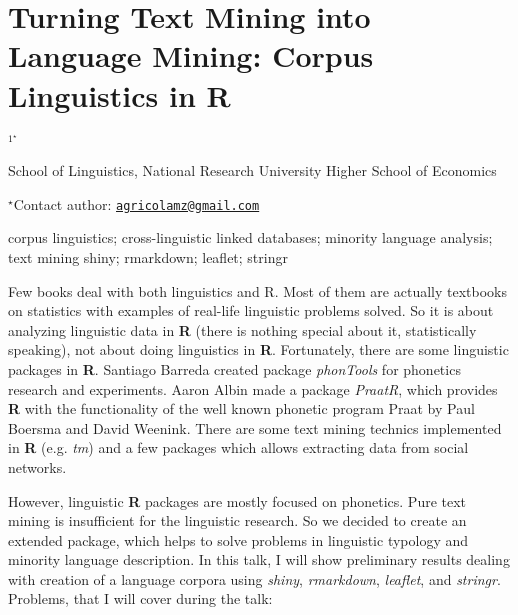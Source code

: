 \documentclass[\main/boa.tex]{subfiles}
\begin{document}
\section{Turning Text Mining into Language Mining: Corpus Linguistics in R}

\begin{center}
  {\bf {}$^{1^\star}$}
\end{center}

\vskip 0.3cm

\begin{affiliations}
\begin{enumerate}
\begin{minipage}{0.915\textwidth}
\centering
\item School of Linguistics, National Research University Higher School of
Economics \\[-2pt]
\end{minipage}
\end{enumerate}
$^\star$Contact author: \href{mailto:agricolamz@gmail.com}{\nolinkurl{agricolamz@gmail.com}}\\
\end{affiliations}

\vskip 0.5cm

\begin{minipage}{0.915\textwidth}
\keywords corpus linguistics; cross-linguistic linked databases; minority language
analysis; text mining
\packages shiny; rmarkdown; leaflet; stringr
\end{minipage}

\vskip 0.8cm

Few books deal with both linguistics and R. Most of them are actually
textbooks on statistics with examples of real-life linguistic problems
solved. So it is about analyzing linguistic data in \textbf{R} (there is
nothing special about it, statistically speaking), not about doing
linguistics in \textbf{R}. Fortunately, there are some linguistic
packages in \textbf{R}. Santiago Barreda created package
\emph{phonTools} for phonetics research and experiments. Aaron Albin
made a package \emph{PraatR}, which provides \textbf{R} with the
functionality of the well known phonetic program Praat by Paul Boersma
and David Weenink. There are some text mining technics implemented in
\textbf{R} (e.g. \emph{tm}) and a few packages which allows extracting
data from social networks.

However, linguistic \textbf{R} packages are mostly focused on phonetics.
Pure text mining is insufficient for the linguistic research. So we
decided to create an extended package, which helps to solve problems in
linguistic typology and minority language description. In this talk, I
will show preliminary results dealing with creation of a language
corpora using \emph{shiny}, \emph{rmarkdown}, \emph{leaflet}, and
\emph{stringr}. Problems, that I will cover during the talk:
\end{document}
